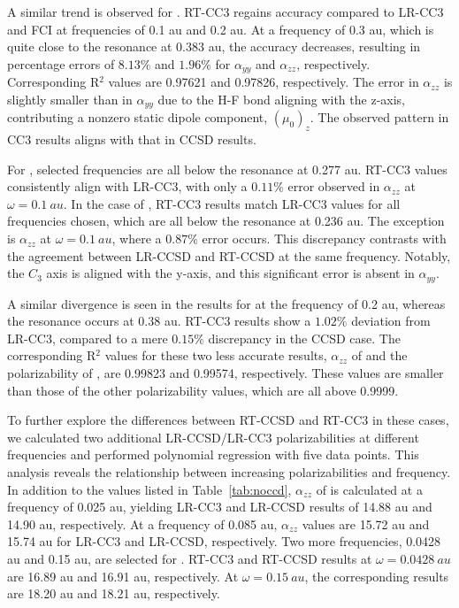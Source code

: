 A similar trend is observed for . RT-CC3 regains accuracy compared to LR-CC3 and FCI at frequencies of 0.1 au and 0.2 au. At a frequency of 0.3 au, which is quite close to the resonance at 0.383 au, the accuracy decreases, resulting in percentage errors of $8.13\%$ and $1.96\%$ for $\alpha_{yy}$ and $\alpha_{zz}$, respectively. Corresponding R$^{2}$ values are 0.97621 and 0.97826, respectively. The error in $\alpha_{zz}$ is slightly smaller than in $\alpha_{yy}$ due to the H-F bond aligning with the z-axis, contributing a nonzero static dipole component, $(\mu_{0})_{z}$. The observed pattern in CC3 results aligns with that in CCSD results.

For , selected frequencies are all below the resonance at 0.277 au. RT-CC3 values consistently align with LR-CC3, with only a $0.11\%$ error observed in $\alpha_{zz}$ at $\omega=0.1\ au$. In the case of , RT-CC3 results match LR-CC3 values for all frequencies chosen, which are all below the resonance at 0.236 au. The exception is $\alpha_{zz}$ at $\omega=0.1\ au$, where a $0.87\%$ error occurs. This discrepancy contrasts with the agreement between LR-CCSD and RT-CCSD at the same frequency. Notably, the $C_{3}$ axis is aligned with the y-axis, and this significant error is absent in $\alpha_{yy}$.

A similar divergence is seen in the results for  at the frequency of 0.2 au, whereas the resonance occurs at 0.38 au. RT-CC3 results show a $1.02\%$ deviation from LR-CC3, compared to a mere $0.15\%$ discrepancy in the CCSD case. The corresponding R$^{2}$ values for these two less accurate results, $\alpha_{zz}$ of  and the polarizability of , are 0.99823 and 0.99574, respectively. These values are smaller than those of the other polarizability values, which are all above 0.9999.

To further explore the differences between RT-CCSD and RT-CC3 in these cases, we calculated two additional LR-CCSD/LR-CC3 polarizabilities at different frequencies and performed polynomial regression with five data points. This analysis reveals the relationship between increasing polarizabilities and frequency. In addition to the values listed in Table~\ref{tab:noccd}, $\alpha_{zz}$ of  is calculated at a frequency of 0.025 au, yielding LR-CC3 and LR-CCSD results of 14.88 au and 14.90 au, respectively. At a frequency of 0.085 au, $\alpha_{zz}$ values are 15.72 au and 15.74 au for LR-CC3 and LR-CCSD, respectively. Two more frequencies, 0.0428 au and 0.15 au, are selected for . RT-CC3 and RT-CCSD results at $\omega=0.0428\ au$ are 16.89 au and 16.91 au, respectively. At $\omega=0.15\ au$, the corresponding results are 18.20 au and 18.21 au, respectively.

